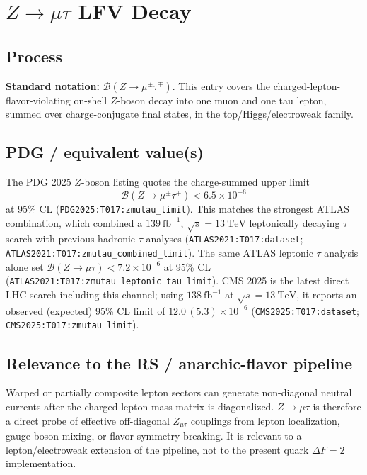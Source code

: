 
\section{\texorpdfstring{\(Z\to\mu\tau\)}{Z -> mu tau} LFV Decay}

\subsection*{Process}
\textbf{Standard notation:} \(\mathcal{B}(Z\to\mu^\pm\tau^\mp)\).
This entry covers the charged-lepton-flavor-violating on-shell \(Z\)-boson
decay into one muon and one tau lepton, summed over charge-conjugate final
states, in the top/Higgs/electroweak family.

\subsection*{PDG / equivalent value(s)}
The PDG 2025 \(Z\)-boson listing quotes the charge-summed upper limit
\[
  \mathcal{B}(Z\to\mu^\pm\tau^\mp) < 6.5\times 10^{-6}
\]
at 95\% CL (\texttt{PDG2025:T017:zmutau\_limit}).  This matches the strongest
ATLAS combination, which combined a \(139~\mathrm{fb}^{-1}\),
\(\sqrt{s}=13~\mathrm{TeV}\) leptonically decaying \(\tau\) search with
previous hadronic-\(\tau\) analyses
(\texttt{ATLAS2021:T017:dataset};
\texttt{ATLAS2021:T017:zmutau\_combined\_limit}).  The same ATLAS leptonic
\(\tau\) analysis alone set
\(\mathcal{B}(Z\to\mu\tau)<7.2\times10^{-6}\) at 95\% CL
(\texttt{ATLAS2021:T017:zmutau\_leptonic\_tau\_limit}).  CMS 2025 is the
latest direct LHC search including this channel; using
\(138~\mathrm{fb}^{-1}\) at \(\sqrt{s}=13~\mathrm{TeV}\), it reports an
observed (expected) 95\% CL limit of
\(12.0\,(5.3)\times10^{-6}\)
(\texttt{CMS2025:T017:dataset}; \texttt{CMS2025:T017:zmutau\_limit}).

\subsection*{Relevance to the RS / anarchic-flavor pipeline}
Warped or partially composite lepton sectors can generate non-diagonal
neutral currents after the charged-lepton mass matrix is diagonalized.
\(Z\to\mu\tau\) is therefore a direct probe of effective off-diagonal
\(Z_{\mu\tau}\) couplings from lepton localization, gauge-boson mixing, or
flavor-symmetry breaking.  It is relevant to a lepton/electroweak extension of
the pipeline, not to the present quark \(\Delta F=2\) implementation.


